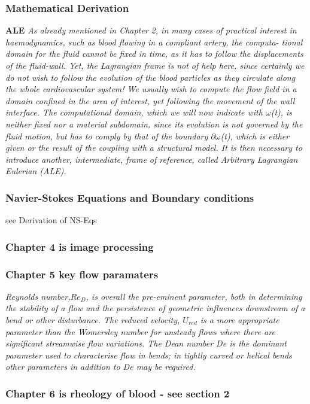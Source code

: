 \documentclass[11pt,letterpaper]{article}
\begin{document}
\subsubsection*{Mathematical Derivation} \textbf{ALE} \textit{As already mentioned in Chapter 2, in many cases of practical interest in haemodynamics, such as blood flowing in a compliant artery, the computa- tional domain for the fluid cannot be fixed in time, as it has to follow the displacements of the fluid-wall. Yet, the Lagrangian frame is not of help here, since certainly we do not wish to follow the evolution of the blood particles as they circulate along the whole cardiovascular system! We usually wish to compute the flow field in a domain confined in the area of interest, yet following the movement of the wall interface. The computational domain, which we will now indicate with $\omega$(t), is neither fixed nor a material subdomain, since its evolution is not governed by the fluid motion, but has to comply by that of the boundary $\partial\omega$(t), which is either given or the result of the coupling with a structural model. It is then necessary to introduce another, intermediate, frame of reference, called Arbitrary Lagrangian Eulerian (ALE).}

\subsubsection*{Navier-Stokes Equations and Boundary conditions} see Derivation of NS-Eqs

\subsubsection*{Chapter 4 is image processing}
\subsubsection*{Chapter 5 key flow paramaters} \textit{Reynolds number,$Re_D$, is overall the pre-eminent parameter, both in determining the stability of a flow and the persistence of geometric influences downstream of a bend or other disturbance. The reduced velocity, $U_{red}$ is a more appropriate parameter than the Womersley number for unsteady flows where there are significant streamwise flow variations. The Dean number De is the dominant parameter used to characterise flow in bends; in tightly curved or helical bends other parameters in addition to De may be required.}
\subsubsection*{Chapter 6 is rheology of blood - see section 2}
\end{document}
